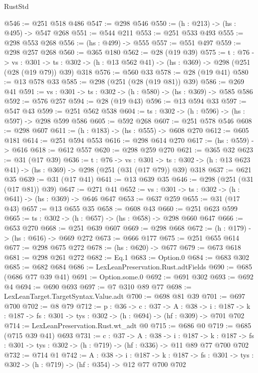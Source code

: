 \begin{lexlean}{RustStd}
\begin{coremodule}
@546 := @251 @518 @486
@547 := @298 @546
@550 := (h : @213) -> (hs : @495) -> @547 @268
@551 := @544 @211
@553 := @251 @533 @493
@555 := @298 @553 @268
@556 := (hs : @499) -> @555
@557 := @551 @497
@559 := @298 @257 @268
@560 := @365 @180
@562 := @28 (@19 @39)
@575 := {t : @76} ->
  {vs : @301} ->
  {ts : @302} -> (h : @13 @562 @41) -> (hs : @369) -> @298 (@251 (@28 (@19 @79)) @39) @318
@576 := @560 @33
@578 := @28 (@19 @41)
@580 := @13 @578 @33
@585 := @298 (@251 (@28 (@19 @81)) @39)
@586 := @269 @41
@591 := {vs : @301} -> {ts : @302} -> (h : @580) -> (hs : @369) -> @585 @586
@592 := @576 @257
@594 := @28 (@19 @43)
@596 := @13 @594 @33
@597 := @547 @43
@599 := @251 @562 @538
@604 := {ts : @302} -> (h : @596) -> (hs : @597) -> @298 @599 @586
@605 := @592 @268
@607 := @251 @578 @546
@608 := @298 @607
@611 := (h : @183) -> (hs : @555) -> @608 @270
@612 := @605 @181
@614 := @251 @594 @553
@616 := @298 @614 @270
@617 := (hs : @559) -> @616
@618 := @612 @557
@620 := @298 @259 @270
@621 := @365 @32
@623 := @31 (@17 @39)
@636 := {t : @76} ->
  {vs : @301} ->
  {ts : @302} -> (h : @13 @623 @41) -> (hs : @369) -> @298 (@251 (@31 (@17 @79)) @39) @318
@637 := @621 @35
@639 := @31 (@17 @41)
@641 := @13 @639 @35
@646 := @298 (@251 (@31 (@17 @81)) @39)
@647 := @271 @41
@652 := {vs : @301} -> {ts : @302} -> (h : @641) -> (hs : @369) -> @646 @647
@653 := @637 @259
@655 := @31 (@17 @43)
@657 := @13 @655 @35
@658 := @608 @43
@660 := @251 @623 @599
@665 := {ts : @302} -> (h : @657) -> (hs : @658) -> @298 @660 @647
@666 := @653 @270
@668 := @251 @639 @607
@669 := @298 @668
@672 := (h : @179) -> (hs : @616) -> @669 @272
@673 := @666 @177
@675 := @251 @655 @614
@677 := @298 @675 @272
@678 := (hs : @620) -> @677
@679 := @673 @618
@681 := @298 @261 @272
@682 := Eq.{1}
@683 := Option.{0}
@684 := @683 @302
@685 := @682 @684
@686 := LexLeanPreservation.Rust.adtFields
@690 := @685 (@686 @77 @39 @41)
@691 := Option.some.{0}
@692 := @691 @302
@693 := @692 @4
@694 := @690 @693
@697 := @7 @310 @89 @77
@698 := LexLeanTarget.TargetSyntax.Value.adt
@700 := @698 @81 @39
@701 := @697 @700
@702 := @8 @79
@712 := {p : @36} ->
  {c : @37} ->
  {A : @38} ->
  {i : @187} -> {k : @187} -> {fs : @301} -> {tys : @302} -> (h : @694) -> (hf : @309) -> @701 @702
@714 := LexLeanPreservation.Rust.wt_adt @0
@715 := @686 @0
@719 := @685 (@715 @39 @41) @693
@731 := {c : @37} ->
  {A : @38} ->
  {i : @187} ->
  {k : @187} -> {fs : @301} -> {tys : @302} -> (h : @719) -> (hf : @336) -> @11 @89 @77 @700 @702
@732 := @714 @1
@742 := {A : @38} ->
  {i : @187} ->
  {k : @187} -> {fs : @301} -> {tys : @302} -> (h : @719) -> (hf : @354) -> @12 @77 @700 @702

\end{coremodule}
\end{lexlean}
